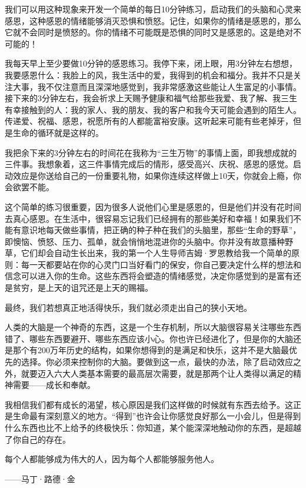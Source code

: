 我们可以用这种现象来开发一个简单的每日10分钟练习，启动我们的头脑和心灵来感恩，这种感恩的情绪能够消灭恐惧和愤怒。记住，如果你的情绪是感恩的，那么它就不会同时是愤怒的。你的情绪不可能既是恐惧的同时又是感恩的。这是绝对不可能的！

我每天早上至少要做10分钟的感恩练习。我停下来，闭上眼，用3分钟左右想想，我要感恩什么：我脸上的风，我生活中的爱，我得到的机会和福分。我并不只是关注大事，我不仅注意而且深深地感觉到，我非常感激这些能让人生富足的小事情。接下来的3分钟左右，我会祈求上天赐予健康和福气给那些我爱、我了解、我三生有幸接触到的人：我的家人、我的朋友、我的客户和我今天可能会遇到的陌生人。传递爱、祝福、感恩，祝愿所有的人都能富裕安康。这听起来可能有些老掉牙，但是生命的循环就是这样的。

我把余下来的3分钟左右的时间花在我称为“三生万物”的事情上面，即我想成就的三件事。我想象着，这三件事情完成后的情形，感受高兴、庆祝、感恩的感觉。启动效应是你送给自己的一份重要礼物，如果你连续这样做上10天，你就会上瘾，你会欲罢不能。

这个简单的练习很重要，因为很多人说他们心里是感恩的，但是他们并没有花时间去真心感恩。在生活中，很容易忘记我们已经拥有的那些美好和幸福！如果我们不能有意识地每天做些事情，把正确的种子种在我们的头脑里，那些“生命的野草”，即懊恼、愤怒、压力、孤单，就会悄悄地混进你的头脑中。你并没有故意播种野草，它们却会自动生长出来，我的第一个人生导师吉姆·罗恩教给我一个简单的原则：每一天都要站在你的心灵门口当好看门的保安，你自己要决定什么样的想法和信念可以进入你的生命。这些东西将会塑造的情绪感觉，决定你感觉到的是富有还是贫穷，是上天的诅咒还是上天的赐福。

最终，我们若想真正地活得快乐，我们就必须走出自己的狭小天地。

人类的大脑是一个神奇的东西，这是一个生存机制，所以大脑很容易关注哪些东西错了、哪些东西要避开、哪些东西应该小心。你也许已经进化了，但是你的大脑还是那个有200万年历史的结构，如果你想得到的是满足和快乐，这并不是大脑最优先的选择。你必须来控制你的大脑。要做到这一点，最快的办法，除了启动效应之外，就要迈入六大人类基本需要的最高层次需要，就是那两个让人类得以满足的精神需要——成长和奉献。

我相信我们都有成长的渴望，核心原因是我们这样做的时候就有东西去给予。这正是生命最有深刻意义的地方。“得到”也许会让你感觉良好那么一小会儿，但是得到什么东西也比不上给予的终极快乐：你知道，某个能深深地触动你的东西，是超越了你自己的存在。

\begin{BookQuote}
每个人都能够成为伟大的人，因为每个人都能够服务他人。

\hfill ——马丁·路德·金
\end{BookQuote}

